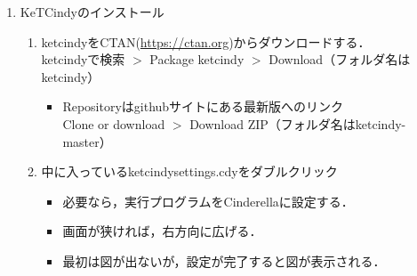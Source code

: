 \documentclass{ujarticle}
\begin{document}
\begin{enumerate}[\bf\large 1.]
\item KeTCindyのインストール
  \begin{enumerate}[(1)]
  \item ketcindyをCTAN(\url{https://ctan.org})からダウンロードする．\\
  \hspace*{10mm}ketcindyで検索 $>$ Package ketcindy $>$ Download（フォルダ名はketcindy）
    \begin{itemize}
    \item Repositoryはgithubサイトにある最新版へのリンク\\
        \hspace*{10mm}Clone or download $>$ Download ZIP（フォルダ名はketcindy-master）        \end{itemize}
  \item 中に入っているketcindysettings.cdyをダブルクリック
    \begin{itemize}
    \item 必要なら，実行プログラムをCinderellaに設定する．
   \item 画面が狭ければ，右方向に広げる．
  \item 最初は図が出ないが，設定が完了すると図が表示される．
   \end{itemize}

\vspace{3mm}


\end{enumerate}
\end{enumerate}
\end{document}

